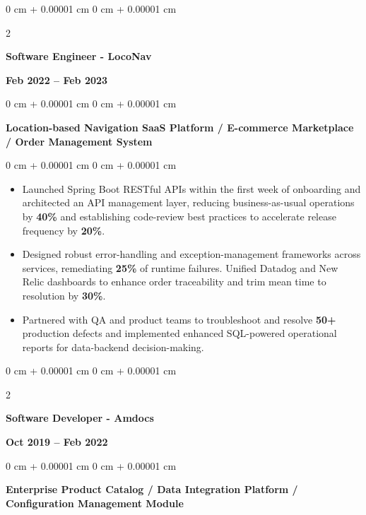 \documentclass[10pt, letterpaper]{article}
\newenvironment{highlights}{
    \begin{itemize}[
        topsep=0.10 cm,
        parsep=0.10 cm,
        partopsep=0pt,
        itemsep=0pt,
        leftmargin=0 cm + 10pt
    ]
}{
    \end{itemize}
} %
\newenvironment{onecolentry}{
    \begin{adjustwidth}{
        0 cm + 0.00001 cm
    }{
        0 cm + 0.00001 cm
    }
}{
    \end{adjustwidth}
} %
\newenvironment{twocolentry}[2][]{
    \onecolentry
    \def\secondColumn{#2}
    \setcolumnwidth{\fill, 4.5 cm}
    \begin{paracol}{2}
}{
    \switchcolumn \raggedleft \secondColumn
    \end{paracol}
    \endonecolentry
} %
\begin{document}
        \vspace{0.1 cm}
        \begin{twocolentry}{\textbf{Feb 2022 – Feb 2023}}
            \textbf{Software Engineer - LocoNav}
            \end{twocolentry}
            \begin{onecolentry}
                \textbf{Location-based Navigation SaaS Platform / E-commerce Marketplace / Order Management System}
            \end{onecolentry}
        \vspace{0.10 cm}
        \begin{onecolentry}
            \begin{highlights}
                \item Launched Spring Boot RESTful APIs within the first week of onboarding and architected an API management layer, reducing business-as-usual operations by \textbf{40\%} and establishing code-review best practices to accelerate release frequency by \textbf{20\%}.
                
                
                \item Designed robust error-handling and exception-management frameworks across services, remediating \textbf{25\%} of runtime failures. Unified Datadog and New Relic dashboards to enhance order traceability and trim mean time to resolution by \textbf{30\%}.

                \item Partnered with QA and product teams to troubleshoot and resolve \textbf{50+} production defects and implemented enhanced SQL-powered operational reports for data-backend decision-making.
            \end{highlights}
        \end{onecolentry}


        \vspace{0.1 cm}
        \begin{twocolentry}{\textbf{Oct 2019 – Feb 2022}}
            \textbf{Software Developer - Amdocs}
        \end{twocolentry}
        \begin{onecolentry}
                \textbf{Enterprise Product Catalog / Data Integration Platform / Configuration Management Module}

        \end{onecolentry}
\end{document}
